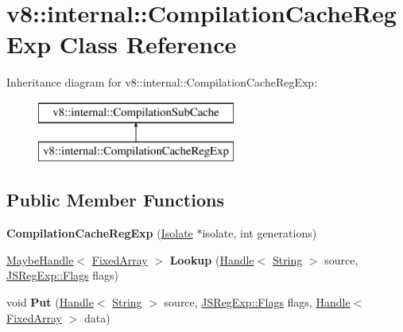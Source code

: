 \hypertarget{classv8_1_1internal_1_1_compilation_cache_reg_exp}{}\section{v8\+:\+:internal\+:\+:Compilation\+Cache\+Reg\+Exp Class Reference}
\label{classv8_1_1internal_1_1_compilation_cache_reg_exp}
Inheritance diagram for v8\+:\+:internal\+:\+:Compilation\+Cache\+Reg\+Exp\+:\begin{figure}[H]
\begin{center}
\leavevmode
\includegraphics[height=2.000000cm]{classv8_1_1internal_1_1_compilation_cache_reg_exp}
\end{center}
\end{figure}
\subsection*{Public Member Functions}
\begin{DoxyCompactItemize}
\item 
{\bfseries Compilation\+Cache\+Reg\+Exp} (\hyperlink{classv8_1_1internal_1_1_isolate}{Isolate} $\ast$isolate, int generations)\hypertarget{classv8_1_1internal_1_1_compilation_cache_reg_exp_ada53fa1cf4c913dba298fc11f491324b}{}\label{classv8_1_1internal_1_1_compilation_cache_reg_exp_ada53fa1cf4c913dba298fc11f491324b}

\item 
\hyperlink{classv8_1_1internal_1_1_maybe_handle}{Maybe\+Handle}$<$ \hyperlink{classv8_1_1internal_1_1_fixed_array}{Fixed\+Array} $>$ {\bfseries Lookup} (\hyperlink{classv8_1_1internal_1_1_handle}{Handle}$<$ \hyperlink{classv8_1_1internal_1_1_string}{String} $>$ source, \hyperlink{classv8_1_1base_1_1_flags}{J\+S\+Reg\+Exp\+::\+Flags} flags)\hypertarget{classv8_1_1internal_1_1_compilation_cache_reg_exp_a0bb213af930b7215707b5da49f142ba8}{}\label{classv8_1_1internal_1_1_compilation_cache_reg_exp_a0bb213af930b7215707b5da49f142ba8}

\item 
void {\bfseries Put} (\hyperlink{classv8_1_1internal_1_1_handle}{Handle}$<$ \hyperlink{classv8_1_1internal_1_1_string}{String} $>$ source, \hyperlink{classv8_1_1base_1_1_flags}{J\+S\+Reg\+Exp\+::\+Flags} flags, \hyperlink{classv8_1_1internal_1_1_handle}{Handle}$<$ \hyperlink{classv8_1_1internal_1_1_fixed_array}{Fixed\+Array} $>$ data)\hypertarget{classv8_1_1internal_1_1_compilation_cache_reg_exp_aba3d849c1552a2c1327504221f81279c}{}\label{classv8_1_1internal_1_1_compilation_cache_reg_exp_aba3d849c1552a2c1327504221f81279c}

\end{DoxyCompactItemize}
